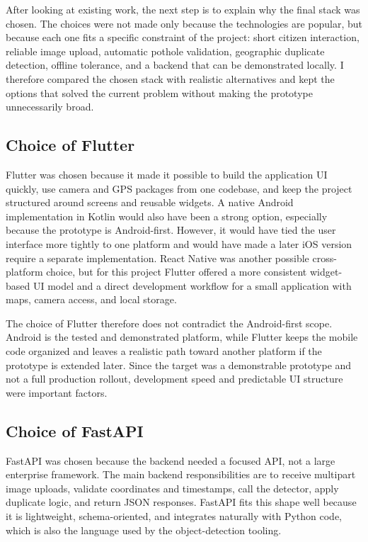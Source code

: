 After looking at existing work, the next step is to explain why the final stack was chosen. The choices were not made only because the technologies are popular, but because each one fits a specific constraint of the project: short citizen interaction, reliable image upload, automatic pothole validation, geographic duplicate detection, offline tolerance, and a backend that can be demonstrated locally. I therefore compared the chosen stack with realistic alternatives and kept the options that solved the current problem without making the prototype unnecessarily broad.

\subsection{Choice of Flutter}

Flutter was chosen because it made it possible to build the application UI quickly, use camera and GPS packages from one codebase, and keep the project structured around screens and reusable widgets. A native Android implementation in Kotlin would also have been a strong option, especially because the prototype is Android-first. However, it would have tied the user interface more tightly to one platform and would have made a later iOS version require a separate implementation. React Native was another possible cross-platform choice, but for this project Flutter offered a more consistent widget-based UI model and a direct development workflow for a small application with maps, camera access, and local storage.

The choice of Flutter therefore does not contradict the Android-first scope. Android is the tested and demonstrated platform, while Flutter keeps the mobile code organized and leaves a realistic path toward another platform if the prototype is extended later. Since the target was a demonstrable prototype and not a full production rollout, development speed and predictable UI structure were important factors.

\subsection{Choice of FastAPI}

FastAPI was chosen because the backend needed a focused API, not a large enterprise framework. The main backend responsibilities are to receive multipart image uploads, validate coordinates and timestamps, call the detector, apply duplicate logic, and return JSON responses. FastAPI fits this shape well because it is lightweight, schema-oriented, and integrates naturally with Python code, which is also the language used by the object-detection tooling.

